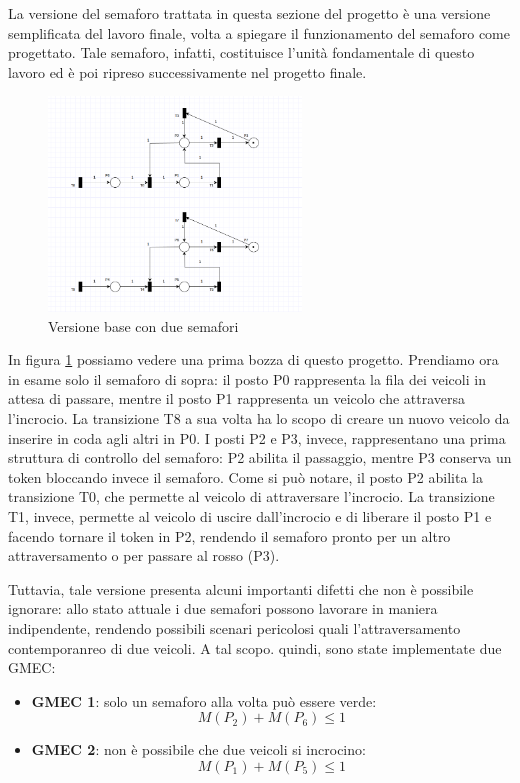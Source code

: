 La versione del semaforo trattata in questa sezione del progetto è una versione semplificata del lavoro finale, volta a spiegare il funzionamento del semaforo come progettato. Tale semaforo, infatti, costituisce l'unità fondamentale di questo lavoro ed è poi ripreso successivamente nel progetto finale.

\begin{figure}[h]
    \centering
    \includegraphics[width=0.6\textwidth]{figure/project_screenshots/semafori.png}
    \caption{Versione base con due semafori}
    \label{fig:semafori}
\end{figure}

In figura \ref{fig:semafori} possiamo vedere una prima bozza di questo progetto. Prendiamo ora in esame solo il semaforo di sopra: il posto P0 rappresenta la fila dei veicoli in attesa di passare, mentre il posto P1 rappresenta un veicolo che attraversa l'incrocio. La transizione T8 a sua volta ha lo scopo di creare un nuovo veicolo da inserire in coda agli altri in P0. I posti P2 e P3, invece, rappresentano una prima struttura di controllo del semaforo: P2 abilita il passaggio, mentre P3 conserva un token bloccando invece il semaforo. Come si può notare, il posto P2 abilita la transizione T0, che permette al veicolo di attraversare l'incrocio. La transizione T1, invece, permette al veicolo di uscire dall'incrocio e di liberare il posto P1 e facendo tornare il token in P2, rendendo il semaforo pronto per un altro attraversamento o per passare al rosso (P3).

Tuttavia, tale versione presenta alcuni importanti difetti che non è possibile ignorare: allo stato attuale i due semafori possono lavorare in maniera indipendente, rendendo possibili scenari pericolosi quali l'attraversamento contemporanreo di due veicoli. A tal scopo. quindi, sono state implementate due GMEC: 

\begin{itemize}
    \item \textbf{GMEC 1}: solo un semaforo alla volta può essere verde:
    \begin{equation}
        M(P_{2}) + M(P_{6}) \leq 1
    \end{equation}

    \item \textbf{GMEC 2}: non è possibile che due veicoli si incrocino:
    \begin{equation}
        M(P_{1}) + M(P_{5}) \leq 1
    \end{equation}
\end{itemize}

